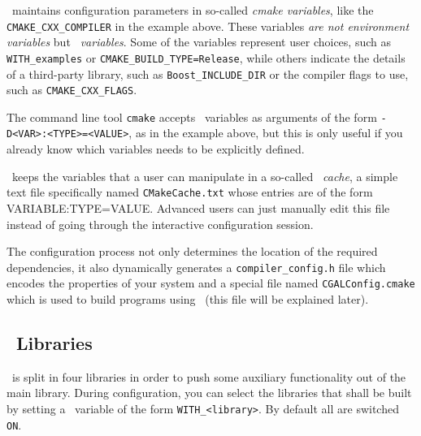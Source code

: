 \cmake\ maintains configuration parameters in so-called {\em cmake variables}, like the \texttt{CMAKE\_CXX\_COMPILER}
in the example above. These variables {\em are not environment variables} but {\em \cmake\ variables}. Some of the \cmake{} 
variables represent user choices, such as \texttt{WITH\_examples} or \texttt{CMAKE\_BUILD\_TYPE=Release}, while others
indicate the details of a third-party library, such as \texttt{Boost\_INCLUDE\_DIR} or the compiler flags to use,
such as \texttt{CMAKE\_CXX\_FLAGS}. 

The command line tool \texttt{cmake} accepts \cmake\ variables as arguments of the form \texttt{-D<VAR>:<TYPE>=<VALUE>}, as
in the example above, but this is only useful if you already know which variables needs to be explicitly defined.

\begin{ccAdvanced}
\cmake\ keeps the variables that a user can manipulate in a so-called {\em \cmake\ cache}, a simple text file specifically 
named \texttt{CMakeCache.txt} whose entries are of the form VARIABLE:TYPE=VALUE. Advanced users can just manually edit this 
file instead of going through the interactive configuration session.
\end{ccAdvanced}


The configuration process not only determines the location of the required dependencies, it also dynamically generates a
\texttt{compiler\_config.h} file which encodes the properties of your system and a special file named 
\texttt{CGALConfig.cmake} which is used to build programs using \cgal\ (this file will be explained later).

\subsection{\cgal\ Libraries}

\cgal\ is split in four libraries in order to push some auxiliary 
functionality out of the main library. During configuration, you can select the libraries that 
shall be built by setting a \cmake\ variable of the form {\tt WITH\_<library>}. By default all 
are switched \texttt{ON}.

